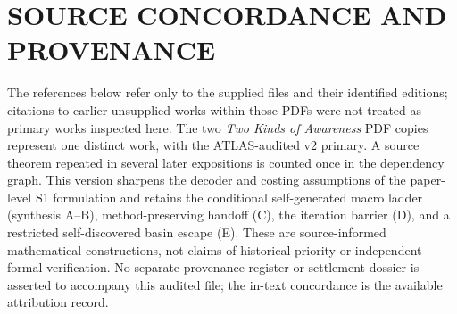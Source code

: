 \documentclass[11pt,letterpaper]{article}
\theoremstyle{definition}
\theoremstyle{remark}
\begin{document}
\section*{SOURCE CONCORDANCE AND PROVENANCE}
The references below refer only to the supplied files and their identified editions; citations to earlier unsupplied works within those PDFs were not treated as primary works inspected here. The two \emph{Two Kinds of Awareness} PDF copies represent one distinct work, with the ATLAS-audited v2 primary. A source theorem repeated in several later expositions is counted once in the dependency graph. This version sharpens the decoder and costing assumptions of the paper-level S1 formulation and retains the conditional self-generated macro ladder (synthesis A--B), method-preserving handoff (C), the iteration barrier (D), and a restricted self-discovered basin escape (E). These are source-informed mathematical constructions, not claims of historical priority or independent formal verification. No separate provenance register or settlement dossier is asserted to accompany this audited file; the in-text concordance is the available attribution record.
\end{document}
